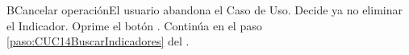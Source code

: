 		\begin{UCtrayectoriaA}{B}{Cancelar operación}{El usuario abandona el Caso de Uso.}
			\UCpaso[\UCactor] Decide ya no eliminar el Indicador.
			\UCpaso[\UCactor] Oprime el botón .
			\UCpaso Continúa en el paso \ref{paso:CUC14BuscarIndicadores} del .
		\end{UCtrayectoriaA}


